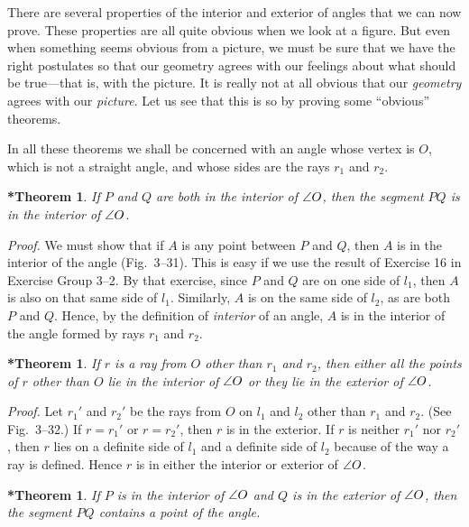 \documentclass[11pt]{book}
\theoremstyle{bkplain}
\newtheorem{IIIsthm}[theorem]{*Theorem}
\begin{document}
There are several properties of the interior and exterior of angles that we can
now prove. These properties are all quite obvious when we look at a figure. But
even when something seems obvious from a picture, we must be sure that we have
the right postulates so that our geometry agrees with our feelings about what
should be true---that is, with the picture. It is really not at all obvious that
our \emph{geometry} agrees with our \emph{picture}. Let us see that this is so by
proving some ``obvious'' theorems.

In all these theorems we shall be concerned with an angle whose vertex is $O$,
which is not a straight angle, and whose sides are the rays $r_1$ and $r_2$.

\begin{IIIsthm}
If $P$ and $Q$ are both in the interior of $\angle O$, then the segment $PQ$ is in
the interior of $\angle O$.
\end{IIIsthm}

\noindent\emph{Proof.} We must show that if $A$ is any point between $P$ and $Q$,
then $A$ is in the interior of the angle (Fig.~3--31). This is easy if we use the
result of Exercise 16 in Exercise Group 3--2. By that exercise, since $P$ and $Q$
are on one side of $l_1$, then $A$ is also on that same side of $l_1$. Similarly,
$A$ is on the same side of $l_2$, as are both $P$ and $Q$. Hence, by the
definition of \emph{interior} of an angle, $A$ is in the interior of the angle
formed by rays $r_1$ and $r_2$.

\FIGIIITHIRTYONE

\begin{IIIsthm}
If $r$ is a ray from $O$ other than $r_1$ and $r_2$, then either all the points
of $r$ other than $O$ lie in the interior of $\angle O$ or they lie in the
exterior of $\angle O$.
\end{IIIsthm}

\noindent\emph{Proof.} Let $r_1'$ and $r_2'$ be the rays from $O$ on $l_1$ and
$l_2$ other than $r_1$ and $r_2$. (See Fig.~3--32.) If $r = r_1'$ or
$r = r_2'$, then $r$ is in the exterior. If $r$ is neither $r_1'$ nor $r_2'$,
then $r$ lies on a definite side of $l_1$ and a definite side of $l_2$ because of
the way a ray is defined. Hence $r$ is in either the interior or exterior of
$\angle O$.

\FIGIIITHIRTYTWO

\begin{IIIsthm}
If $P$ is in the interior of $\angle O$ and $Q$ is in the exterior of $\angle O$,
then the segment $PQ$ contains a point of the angle.
\end{IIIsthm}
\end{document}
